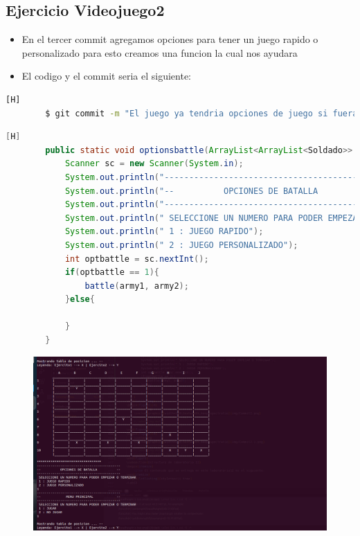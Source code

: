 \documentclass{article}
\begin{document}
	\subsection{Ejercicio Videojuego2}
	\begin{itemize}	
		\item En el tercer commit agregamos opciones para tener un juego rapido o personalizado para esto creamos una funcion la cual nos ayudara  
		\item El codigo y el commit seria el siguiente:
	\end{itemize}	
	\begin{lstlisting}[language=bash,caption={Commit}][H]
		$ git commit -m "El juego ya tendria opciones de juego si fuera un juego rapido falta el personalizado se agregan opciones para ver cual de estas se quiere jugar"
	\end{lstlisting}	
	\begin{lstlisting}[language=java,caption={Las lineas de codigos del metodo creado:}][H]
		public static void optionsbattle(ArrayList<ArrayList<Soldado>> army1 , ArrayList<ArrayList<Soldado>> army2){
			Scanner sc = new Scanner(System.in);
			System.out.println("-------------------------------------------");
			System.out.println("--          OPCIONES DE BATALLA          --"); 
			System.out.println("-------------------------------------------");
			System.out.println(" SELECCIONE UN NUMERO PARA PODER EMPEZAR O TERMINAR");
			System.out.println(" 1 : JUEGO RAPIDO");
			System.out.println(" 2 : JUEGO PERSONALIZADO");
			int optbattle = sc.nextInt();
			if(optbattle == 1){
				battle(army1, army2);
			}else{
	
			}
		}
	\end{lstlisting}
	\begin{figure}[H]
		\centering
		\includegraphics[width=1.0\textwidth,keepaspectratio]{img/Commit3.png}
	\end{figure}
\end{document}
